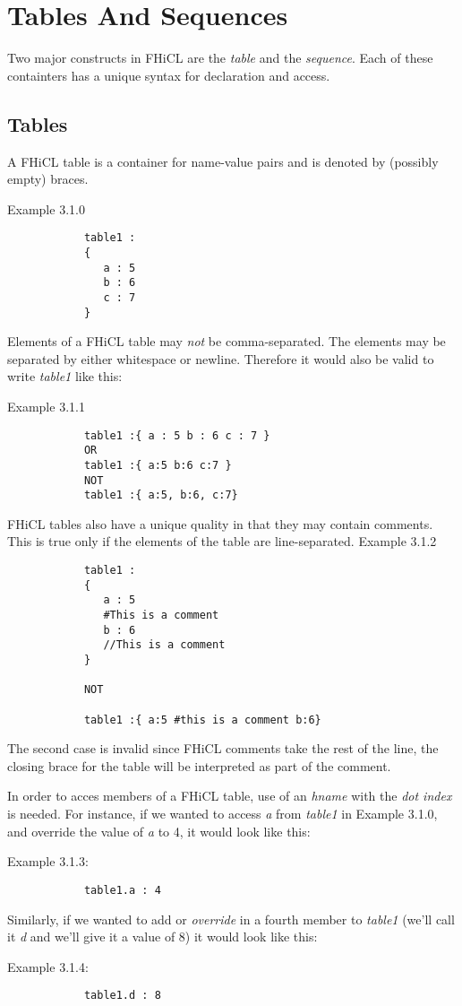 \documentclass{memarticle}
\begin{document}
\section{Tables And Sequences}
	Two major constructs in FHiCL are the \emph{table} and the \emph{sequence}.
	Each of these containters has a unique syntax for declaration and access.

	\subsection{Tables}
		A FHiCL table is a container for name-value pairs
		and is denoted by (possibly empty) braces.
		\par
		Example 3.1.0
		\begin{verbatim}
			table1 :
			{
			   a : 5
			   b : 6
			   c : 7
			}
		\end{verbatim}
		\par
		Elements of a FHiCL table may \emph{not} be comma-separated.
		The elements may be separated by either whitespace or newline.
		Therefore it would also be valid to write \emph{table1} like this:
		\par
		Example 3.1.1
		\begin{verbatim}
			table1 :{ a : 5 b : 6 c : 7 }
			OR
			table1 :{ a:5 b:6 c:7 }
			NOT
			table1 :{ a:5, b:6, c:7}
		\end{verbatim}
		\par
		FHiCL tables also have a unique quality in that they may contain comments.
		This is true only if the elements of the table are line-separated.
		Example 3.1.2
		\begin{verbatim}
			table1 :
			{
			   a : 5
			   #This is a comment
			   b : 6
			   //This is a comment
			}

			NOT

			table1 :{ a:5 #this is a comment b:6}
		\end{verbatim}
		\par
		The second case is invalid since FHiCL comments take the rest of the line,
		the closing brace for the table will be interpreted as part of the comment.
		\par
		In order to acces members of a FHiCL table, use of an \emph{hname}
		with the \emph{dot index} is needed.
		For instance, if we wanted to access \emph{a} from \emph{table1} in Example 3.1.0,
		and override the value of \emph{a} to 4, it would look like this:
		\par
		Example 3.1.3:
		\begin{verbatim}
			table1.a : 4
		\end{verbatim}
		\par
		Similarly, if we wanted to add or \emph{override} in a fourth member to \emph{table1}
		(we'll call it \emph{d} and we'll give it a value of 8)
		it would look like this:
		\par
		Example 3.1.4:
		\begin{verbatim}
			table1.d : 8
		\end{verbatim}
		\par
\end{document}
